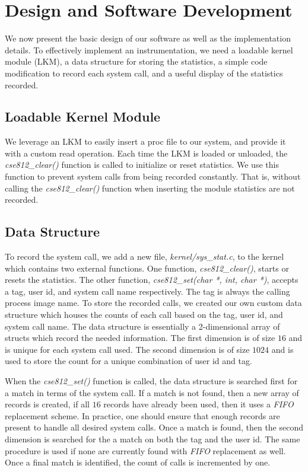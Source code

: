\documentclass[conference]{IEEEtran}
\begin{document}
\section{Design and Software Development}
\label{sec:design}
We now present the basic design of our software as well as the implementation details.
To effectively implement an instrumentation, we need a loadable kernel module (LKM), a data structure for storing the statistics, a simple code modification to record each system call, and a useful display of the statistics recorded.

\subsection{Loadable Kernel Module}
We leverage an LKM to easily insert a proc file to our system, and provide it with a custom read operation.
Each time the LKM is loaded or unloaded, the \textit{cse812\_clear()} function is called to initialize or reset statistics.
We use this function to prevent system calls from being recorded constantly.
That is, without calling the \textit{cse812\_clear()} function when inserting the module statistics are not recorded.

\subsection{Data Structure}
To record the system call, we add a new file, \textit{kernel/sys\_stat.c}, to the kernel which contains two external functions.
One function, \textit{cse812\_clear()}, starts or resets the statistics.
The other function, \textit{cse812\_set(char *, int, char *)}, accepts a tag, user id, and system call name respectively.
The tag is always the calling process image name.
To store the recorded calls, we created our own custom data structure which houses the counts of each call based on the tag, user id, and system call name.
The data structure is essentially a 2-dimensional array of structs which record the needed information.
The first dimension is of size $16$ and is unique for each system call used.
The second dimension is of size $1024$ and is used to store the count for a unique combination of user id and tag.

When the \textit{cse812\_set()} function is called, the data structure is searched first for a match in terms of the system call.
If a match is not found, then a new array of records is created, if all $16$ records have already been used, then it uses a \textit{FIFO} replacement scheme.
In practice, one should ensure that enough records are present to handle all desired system calls.
Once a match is found, then the second dimension is searched for the a match on both the tag and the user id.
The same procedure is used if none are currently found with \textit{FIFO} replacement as well.
Once a final match is identified, the count of calls is incremented by one.
\end{document}

